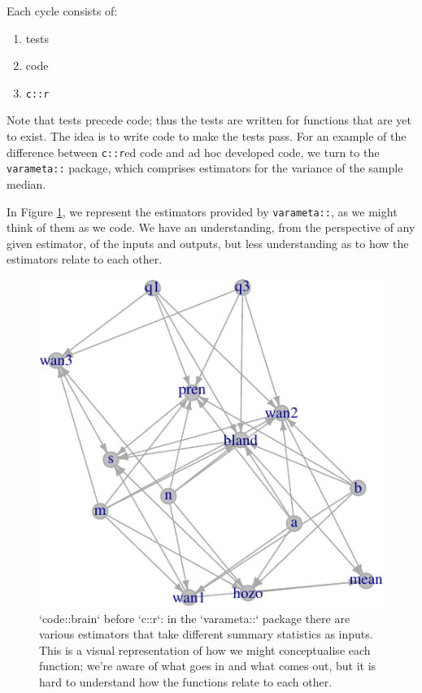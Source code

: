 \documentclass[
]{article}
\providecommand{\tightlist}{%
  \setlength{\itemsep}{0pt}\setlength{\parskip}{0pt}}
\begin{document}
Each cycle consists of:

\begin{enumerate}
\def\labelenumi{\arabic{enumi}.}
\tightlist
\item
  tests
\item
  code
\item
  \texttt{c::r}
\end{enumerate}

Note that tests precede code; thus the tests are written for functions that are yet to exist. The idea is to write code to make the tests pass. For an example of the difference between \texttt{c::r}ed code and ad hoc developed code, we turn to the \texttt{varameta::} package, which comprises estimators for the variance of the sample median.

In Figure \ref{fig:codebrainbad}, we represent the estimators provided by \texttt{varameta::}, as we might think of them as we code. We have an understanding, from the perspective of any given estimator, of the inputs and outputs, but less understanding as to how the estimators relate to each other.

\begin{figure}

{\centering \includegraphics{when-is-done-done_files/figure-latex/codebrainbad-1} 

}

\caption{`code::brain` before `c::r`: in the `varameta::` package there are various estimators that take different summary statistics as inputs. This is a visual representation of how we might conceptualise each function; we're aware of what goes in and what comes out, but it is hard to understand how the functions relate to each other.}\label{fig:codebrainbad}
\end{figure}
\end{document}
